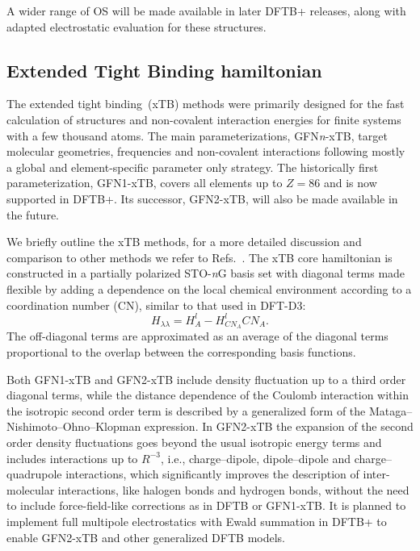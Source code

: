 \documentclass{revtex4-1}
\newcommand{\dftbp}{DFTB+}
\begin{document}
A wider range of OS will be made available in later \dftbp{}
releases, along with adapted electrostatic evaluation for these structures.

\subsection{Extended Tight Binding hamiltonian}

The extended tight binding~(xTB) methods were primarily designed for the fast
calculation of structures and non-covalent interaction energies for finite
systems with a few thousand atoms. The main parameterizations, GFN\textit n-xTB,
target molecular geometries, frequencies and non-covalent interactions following
mostly a global and element-specific parameter only strategy. The historically
first parameterization, GFN1-xTB, covers all elements up to $Z=86$ and is now
supported in \dftbp{}. Its successor, GFN2-xTB,\cite{bannwarth2019} will also be
made available in the future.

We briefly outline the xTB methods, for a more detailed discussion and
comparison to other methods we refer to
Refs.~.  The xTB core hamiltonian is
constructed in a partially polarized STO-\textit nG basis set with diagonal
terms made flexible by adding a dependence on the local chemical environment
according to a coordination number (CN), similar to that used in
DFT-D3:\cite{grimme2010}
%
\begin{equation}
  H_{\lambda\lambda} = H^l_A - H^l_{{CN}_{A}} {CN}_{A}.
\end{equation}
%
The off-diagonal terms are approximated as an average of the diagonal terms
proportional to the overlap between the corresponding basis functions.

Both GFN1-xTB and GFN2-xTB include density fluctuation up to a third order
diagonal terms, while the distance dependence of the Coulomb interaction within
the isotropic second order term is described by a generalized form of the
Mataga--Nishimoto--Ohno--Klopman\cite{klopman1964,ohno1964,mataga1957}
expression. In GFN2-xTB the expansion of the second order density fluctuations
goes beyond the usual isotropic energy terms and includes interactions up to
$R^{-3}$, i.e., charge--dipole, dipole--dipole and charge--quadrupole
interactions, which significantly improves the description of inter-molecular
interactions, like halogen bonds and hydrogen bonds, without the need to
include force-field-like corrections as in DFTB or GFN1-xTB. It is planned to implement full multipole electrostatics with Ewald summation
in \dftbp{} to enable GFN2-xTB and other generalized DFTB
models.\cite{Bodrog2012}
\end{document}
